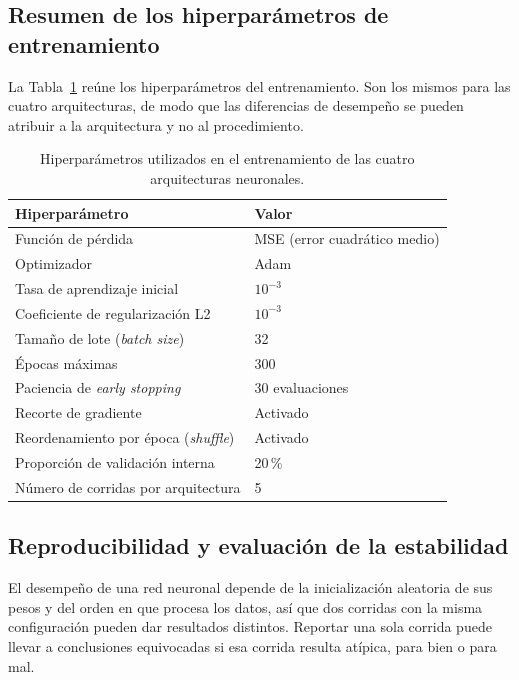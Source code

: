 \documentclass{report}
\begin{document}
\subsection{Resumen de los hiperparámetros de entrenamiento}
\label{subsec:hiperparametros}

La Tabla~\ref{tab:hiperparametros} reúne los hiperparámetros del entrenamiento. Son los mismos para las cuatro arquitecturas, de modo que las diferencias de desempeño se pueden atribuir a la arquitectura y no al procedimiento.

\begin{table}[htbp]
    \centering
    \caption{Hiperparámetros utilizados en el entrenamiento de las cuatro arquitecturas neuronales.}
    \label{tab:hiperparametros}
    \begin{tabular}{ll}
        \toprule
        \textbf{Hiperparámetro} & \textbf{Valor} \\
        \midrule
        Función de pérdida & MSE (error cuadrático medio) \\
        Optimizador & Adam \\
        Tasa de aprendizaje inicial & $10^{-3}$ \\
        Coeficiente de regularización L2 & $10^{-3}$ \\
        Tamaño de lote (\textit{batch size}) & 32 \\
        Épocas máximas & 300 \\
        Paciencia de \textit{early stopping} & 30 evaluaciones \\
        Recorte de gradiente & Activado \\
        Reordenamiento por época (\textit{shuffle}) & Activado \\
        Proporción de validación interna & 20\,\% \\
        Número de corridas por arquitectura & 5 \\
        \bottomrule
    \end{tabular}
\end{table}

\subsection{Reproducibilidad y evaluación de la estabilidad}
\label{subsec:reproducibilidad}

El desempeño de una red neuronal depende de la inicialización aleatoria de sus pesos y del orden en que procesa los datos, así que dos corridas con la misma configuración pueden dar resultados distintos. Reportar una sola corrida puede llevar a conclusiones equivocadas si esa corrida resulta atípica, para bien o para mal.
\end{document}
